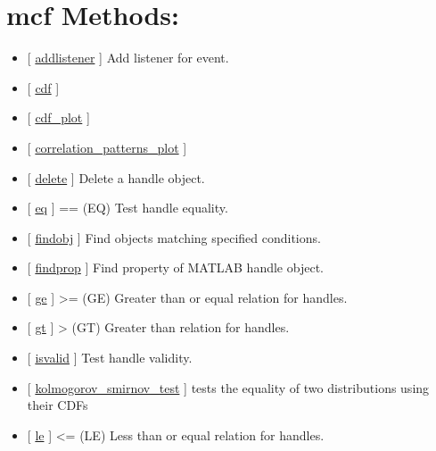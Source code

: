 \documentclass[letterpaper,10pt,english]{sphinxmanual}
\begin{document}
\section{mcf Methods:}
\label{classes/utils/@mcf/mcf:mcf-methods}\begin{itemize}
\item {} 
{[} {\hyperref[classes/utils/@mcf/mcf:addlistener]{addlistener}} {]} Add listener for event.

\item {} 
{[} {\hyperref[classes/utils/@mcf/mcf:cdf]{cdf}} {]}

\item {} 
{[} {\hyperref[classes/utils/@mcf/mcf:cdf-plot]{cdf\_plot}} {]}

\item {} 
{[} {\hyperref[classes/utils/@mcf/mcf:correlation-patterns-plot]{correlation\_patterns\_plot}} {]}

\item {} 
{[} {\hyperref[classes/utils/@mcf/mcf:delete]{delete}} {]} Delete a handle object.

\item {} 
{[} {\hyperref[classes/utils/@mcf/mcf:eq]{eq}} {]}  == (EQ)   Test handle equality.

\item {} 
{[} {\hyperref[classes/utils/@mcf/mcf:findobj]{findobj}} {]} Find objects matching specified conditions.

\item {} 
{[} {\hyperref[classes/utils/@mcf/mcf:findprop]{findprop}} {]} Find property of MATLAB handle object.

\item {} 
{[} {\hyperref[classes/utils/@mcf/mcf:ge]{ge}} {]}  \textgreater{}= (GE)   Greater than or equal relation for handles.

\item {} 
{[} {\hyperref[classes/utils/@mcf/mcf:gt]{gt}} {]}  \textgreater{} (GT)   Greater than relation for handles.

\item {} 
{[} {\hyperref[classes/utils/@mcf/mcf:isvalid]{isvalid}} {]} Test handle validity.

\item {} 
{[} {\hyperref[classes/utils/@mcf/mcf:kolmogorov-smirnov-test]{kolmogorov\_smirnov\_test}} {]}   tests the equality of two distributions using their CDFs

\item {} 
{[} {\hyperref[classes/utils/@mcf/mcf:le]{le}} {]}  \textless{}= (LE)   Less than or equal relation for handles.


\end{itemize}
\end{document}
